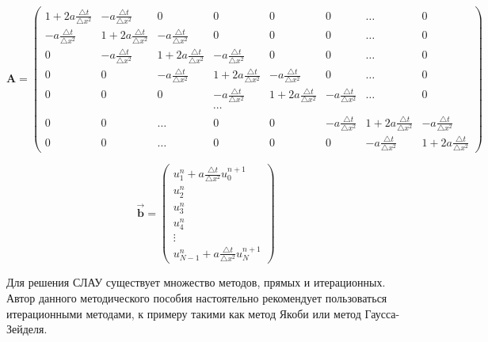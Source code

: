 \documentclass[12pt,a4paper]{article}
\begin{document}
		\begin{equation}
			\mathbf{A} =
			\begin{pmatrix}
				1 + 2 a \frac{\triangle t}{\triangle x^{2}} & - a \frac{\triangle t}{\triangle x^{2}} & 0 & 0 & 0 & 0 & \ldots & 0 \\
				- a \frac{\triangle t}{\triangle x^{2}} & 1 + 2 a \frac{\triangle t}{\triangle x^{2}} & - a \frac{\triangle t}{\triangle x^{2}} & 0 & 0 & 0 & \ldots & 0 \\
				0 & - a \frac{\triangle t}{\triangle x^{2}} & 1 + 2 a \frac{\triangle t}{\triangle x^{2}} & - a \frac{\triangle t}{\triangle x^{2}} & 0 & 0 & \ldots & 0 \\
				0 & 0 & - a \frac{\triangle t}{\triangle x^{2}} & 1 + 2 a \frac{\triangle t}{\triangle x^{2}} & - a \frac{\triangle t}{\triangle x^{2}} & 0 & \ldots & 0 \\
				0 & 0 & 0 & - a \frac{\triangle t}{\triangle x^{2}} & 1 + 2 a \frac{\triangle t}{\triangle x^{2}} & - a \frac{\triangle t}{\triangle x^{2}} & \ldots & 0 \\
				& & & \cdots \\
				0 & 0 & \ldots & 0 & 0 & - a \frac{\triangle t}{\triangle x^{2}} & 1 + 2 a \frac{\triangle t}{\triangle x^{2}} & - a \frac{\triangle t}{\triangle x^{2}} \\
				0 & 0 & \ldots & 0 & 0 & 0 & - a \frac{\triangle t}{\triangle x^{2}} & 1 + 2 a \frac{\triangle t}{\triangle x^{2}}
			\end{pmatrix}			
		\end{equation}

		\begin{equation}
			\vec{\mathbf{b}} =
			\begin{pmatrix}
				u^{n}_{1} + a \frac{\triangle t}{\triangle x^{2}} u^{n+1}_{0} \\
				u^{n}_{2} \\
				u^{n}_{3} \\
				u^{n}_{4} \\
				\vdots \\
				u^{n}_{N-1} + a \frac{\triangle t}{\triangle x^{2}} u^{n+1}_{N}
			\end{pmatrix}
		\end{equation}

		Для решения СЛАУ существует множество методов, прямых и итерационных. Автор данного методического пособия настоятельно рекомендует пользоваться итерационными методами, к примеру такими как метод Якоби или метод Гаусса-Зейделя.\\
\end{document}
